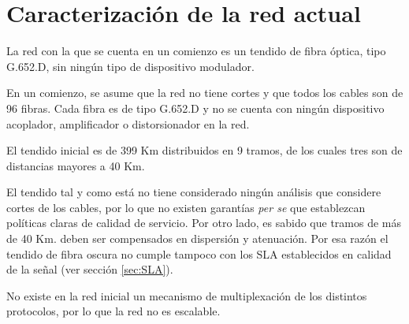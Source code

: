 \section{Caracterización de la red actual}
\label{sec:caracterizacion}

La red con la que se cuenta en un comienzo es un tendido de fibra
óptica, tipo G.652.D, sin ningún tipo de dispositivo modulador.

En un comienzo, se asume que la red no tiene cortes y que todos los
cables son de 96 fibras. Cada fibra es de tipo G.652.D y no se cuenta
con ningún dispositivo acoplador, amplificador o distorsionador en la
red.

El tendido inicial es de 399 Km distribuidos en 9 tramos, de los
cuales tres son de distancias mayores a 40 Km. 

El tendido tal y como está no tiene considerado ningún análisis que
considere cortes de los cables, por lo que no existen garantías
\emph{per se} que establezcan políticas claras de calidad de
servicio. Por otro lado, es sabido que tramos de más de 40 Km. deben
ser compensados en dispersión y atenuación. Por esa razón el tendido
de fibra oscura no cumple tampoco con los SLA establecidos en calidad
de la señal (ver sección \ref{sec:SLA}).

No existe en la red inicial un mecanismo de multiplexación de los
distintos protocolos, por lo que la red no es escalable.






